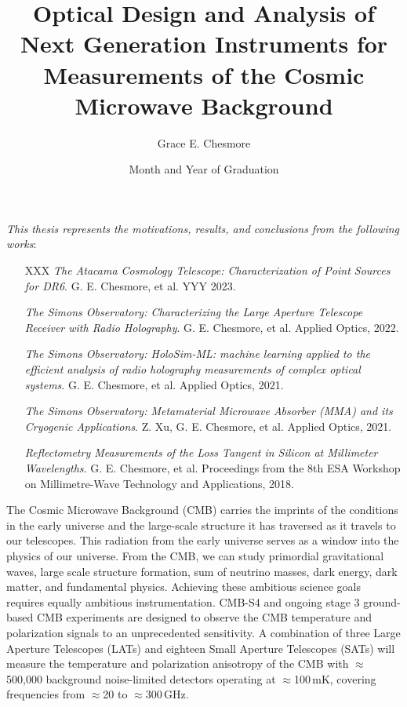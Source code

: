 \documentclass{ucetd}
\title{Optical Design and Analysis of Next Generation Instruments for Measurements of the Cosmic Microwave Background
}
\author{Grace E. Chesmore}
\date{Month and Year of Graduation}  %
\begin{document}
\maketitle

\makecopyright

\tableofcontents
\cleardoublepage
{}
\listoffigures
\cleardoublepage
{}
\listoftables
\newpage

\begin{center}
    \textit{This thesis represents the motivations, results, and conclusions from the following works}:
    \\
    \begin{enumerate}
        \item[XXX] \textit{The Atacama Cosmology Telescope: Characterization of Point Sources for DR6}. G. E. Chesmore, et al. YYY 2023.
        \item[\cite{chesmore2022}] \textit{The Simons Observatory: Characterizing the Large Aperture Telescope Receiver with Radio Holography}. G. E. Chesmore, et al. Applied Optics, 2022.
        \item[\cite{Chesmore:21}] \textit{The Simons Observatory: HoloSim-ML: machine learning applied to the efficient analysis of radio holography measurements of complex optical systems}. G. E. Chesmore, et al. Applied Optics, 2021.
        \item[\cite{Xu_2021}] \textit{The Simons Observatory: Metamaterial Microwave Absorber (MMA) and its Cryogenic Applications}. Z. Xu, G. E. Chesmore, et al. Applied Optics, 2021.
        \item[\cite{ches18}] \textit{Reflectometry Measurements of the Loss Tangent in Silicon at Millimeter Wavelengths}. G. E. Chesmore, et al. Proceedings from the 8th ESA Workshop on Millimetre-Wave Technology and Applications, 2018.
    \end{enumerate}

\end{center}
\newpage

\abstract
The Cosmic Microwave Background (CMB) carries the imprints of the conditions in the early universe and the large-scale structure it has traversed as it travels to our telescopes. This radiation from the early universe serves as a window into the physics of our universe. From the CMB, we can study primordial gravitational waves, large scale structure formation, sum of neutrino masses, dark energy, dark matter, and fundamental physics. Achieving these ambitious science goals requires equally ambitious instrumentation.
CMB-S4 and ongoing stage 3 ground-based CMB experiments are designed to observe the CMB temperature and polarization signals to an unprecedented sensitivity. A combination of three Large Aperture Telescopes (LATs) and eighteen Small Aperture Telescopes (SATs) will measure the temperature and polarization anisotropy of the CMB with $\approx$500,000 background noise-limited detectors operating at $\approx$100\,mK, covering frequencies from $\approx$20 to $\approx$300\,GHz.
\end{document}
